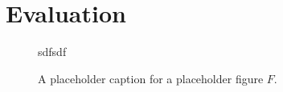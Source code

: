 \section{Evaluation}
\label{sec:eval}

\begin{figure}
  \centerline{}

\caption{A placeholder caption for a placeholder figure \boldmath$F$.}

sdfsdf
\label{fig:placeholder}
\end{figure}

